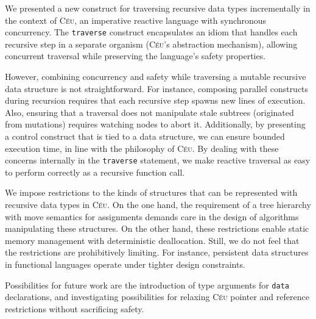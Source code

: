 \documentclass{sig-alternate}
\newcommand{\CEU}{\textsc{C\'{e}u}\xspace}
\newcommand{\code}[1] {{\small{\texttt{#1}}}}
\begin{document}
We presented a new construct for traversing recursive data types
incrementally in the context of \CEU, an imperative reactive language with
synchronous concurrency.
The \code{traverse} construct encapsulates an idiom that handles each recursive 
step in a separate organism (\CEU's abstraction mechanism), allowing concurrent 
traversal %
while preserving the language's safety properties.

However, combining concurrency and safety while traversing a mutable recursive 
data structure is not straightforward.
For instance, composing parallel constructs during recursion requires that each 
recursive step spawns new lines of execution.
Also, ensuring that a traversal does not manipulate stale subtrees (originated 
from mutations) requires watching nodes to abort it.
Additionally, by presenting a control construct that is tied to a data 
structure, we can ensure bounded execution time, in line with the philosophy of
\CEU.
By dealing with these concerns internally in the \code{traverse} statement, we 
make reactive traversal as easy to perform correctly as a recursive function 
call.

We impose restrictions to the kinds of structures that can be represented with 
recursive data types in \CEU.
On the one hand, the requirement of a tree hierarchy with move semantics for 
assignments demands care in the design of algorithms manipulating these 
structures.
On the other hand, these restrictions enable static memory management with
deterministic deallocation.
Still, we do not feel that the restrictions are prohibitively limiting.
For instance, persistent data structures in functional languages 
\cite{okasaki.purely} operate under tighter design constraints.

Possibilities for future work are the introduction of type arguments for 
\code{data} declarations, and investigating possibilities for relaxing \CEU 
pointer and reference restrictions without sacrificing safety.

\balance



\balancecolumns
\end{document}
